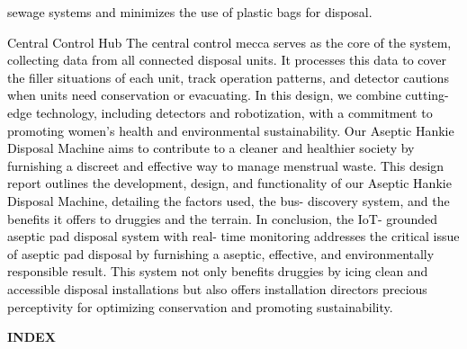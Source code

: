 \documentclass[letterpaper]{article}
\begin{document}
\textcolor{black}{sewage systems and minimizes the use of plastic bags for disposal.}

\textcolor{black}{Central Control Hub The central control mecca serves as the core of the system, collecting data from
all connected disposal units. It processes this data to cover the filler situations of each unit, track operation
patterns, and detector cautions when units need conservation or evacuating. In this design, we combine cutting- edge
technology, including detectors and robotization, with a commitment to promoting women's health and environmental
sustainability. Our Aseptic Hankie Disposal Machine aims to contribute to a cleaner and healthier society by furnishing
a discreet and effective way to manage menstrual waste. This design report outlines the development, design, and
functionality of our Aseptic Hankie Disposal Machine, detailing the factors used, the bus- discovery system, and the
benefits it offers to druggies and the terrain. In conclusion, the IoT- grounded aseptic pad disposal system with real-
time monitoring addresses the critical issue of aseptic pad disposal by furnishing a aseptic, effective, and
environmentally responsible result. This system not only benefits druggies by icing clean and accessible disposal
installations but also offers installation directors precious perceptivity for optimizing conservation and promoting
sustainability.}

\clearpage\setcounter{page}{1}\pagestyle{Convertedv}
{\textbf{INDEX}
\par}


\bigskip


\bigskip
\end{document}

